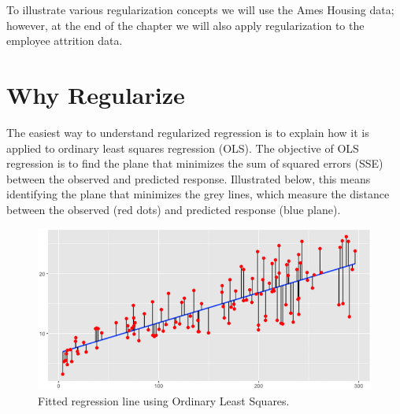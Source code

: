 \documentclass[]{book}
\newenvironment{Shaded}{\begin{snugshade}}{\end{snugshade}}
\newcommand{\CommentTok}[1]{\textcolor[rgb]{0.56,0.35,0.01}{\textit{#1}}}
\newcommand{\DataTypeTok}[1]{\textcolor[rgb]{0.13,0.29,0.53}{#1}}
\newcommand{\DecValTok}[1]{\textcolor[rgb]{0.00,0.00,0.81}{#1}}
\newcommand{\FloatTok}[1]{\textcolor[rgb]{0.00,0.00,0.81}{#1}}
\newcommand{\KeywordTok}[1]{\textcolor[rgb]{0.13,0.29,0.53}{\textbf{#1}}}
\newcommand{\NormalTok}[1]{#1}
\newcommand{\OperatorTok}[1]{\textcolor[rgb]{0.81,0.36,0.00}{\textbf{#1}}}
\newcommand{\StringTok}[1]{\textcolor[rgb]{0.31,0.60,0.02}{#1}}
\theoremstyle{definition}
\theoremstyle{definition}
\theoremstyle{definition}
\theoremstyle{remark}
\begin{document}
To illustrate various regularization concepts we will use the Ames
Housing data; however, at the end of the chapter we will also apply
regularization to the employee attrition data.

\begin{Shaded}
\end{Shaded}

\hypertarget{why}{%
\section{Why Regularize}\label{why}}

The easiest way to understand regularized regression is to explain how
it is applied to ordinary least squares regression (OLS). The objective
of OLS regression is to find the plane that minimizes the sum of squared
errors (SSE) between the observed and predicted response. Illustrated
below, this means identifying the plane that minimizes the grey lines,
which measure the distance between the observed (red dots) and predicted
response (blue plane).

\begin{figure}

{\centering \includegraphics[width=0.7\linewidth,height=0.7\textheight]{illustrations/sq.errors-1} 

}

\caption{Fitted regression line using Ordinary Least Squares.}\label{fig:unnamed-chunk-86}
\end{figure}
\end{document}
